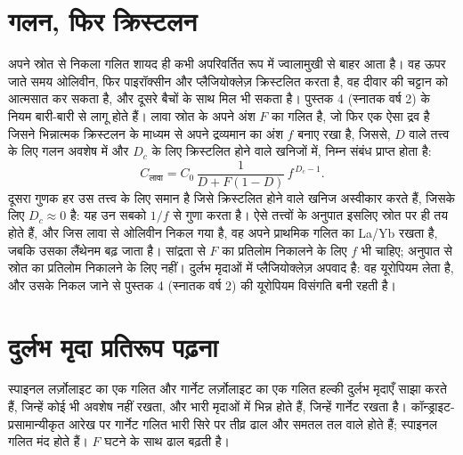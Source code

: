 \section{गलन, फिर क्रिस्टलन}\label{sec:b3:trace-element-modelling:crystallisation}

अपने स्रोत से निकला गलित शायद ही कभी अपरिवर्तित रूप में ज्वालामुखी से बाहर आता है। वह
ऊपर जाते समय ओलिवीन, फिर पाइरॉक्सीन और प्लैजियोक्लेज़ क्रिस्टलित करता है, वह दीवार की चट्टान को आत्मसात कर सकता है,
और दूसरे बैचों के साथ मिल भी सकता है। पुस्तक 4 (स्नातक वर्ष 2) के नियम बारी-बारी से लागू होते हैं।
लावा स्रोत के अपने अंश $F$ का गलित है, जो फिर एक ऐसा द्रव है
जिसने भिन्नात्मक क्रिस्टलन के माध्यम से अपने द्रव्यमान का अंश $f$ बनाए रखा है,
जिससे, $D$ वाले तत्त्व के लिए गलन अवशेष में और $D_c$ के लिए
क्रिस्टलित होने वाले खनिजों में, निम्न संबंध प्राप्त होता है:
\[
C_{\text{लावा}} = C_0\,\frac{1}{D + F(1 - D)}\,f^{\,D_c - 1}.
\]
दूसरा गुणक हर उस तत्त्व के लिए समान है जिसे क्रिस्टलित होने वाले
खनिज अस्वीकार करते हैं, जिसके लिए $D_c \approx 0$ है: यह उन सबको $1/f$ से गुणा करता है। ऐसे तत्त्वों के अनुपात
इसलिए स्रोत पर ही तय होते हैं, और जिस लावा से ओलिवीन निकल गया है, वह अपने प्राथमिक गलित का
La/Yb रखता है, जबकि उसका लैंथेनम बढ़ जाता है। सांद्रता से $F$ का प्रतिलोम निकालने
के लिए $f$ भी चाहिए; अनुपात से स्रोत का प्रतिलोम निकालने के लिए नहीं।
दुर्लभ मृदाओं में प्लैजियोक्लेज़ अपवाद है: वह यूरोपियम लेता है,
और उसके निकल जाने से पुस्तक 4 (स्नातक वर्ष 2) की यूरोपियम विसंगति बनी रहती है।

\section{दुर्लभ मृदा प्रतिरूप पढ़ना}\label{sec:b3:trace-element-modelling:patterns}

स्पाइनल लर्ज़ोलाइट का एक गलित और गार्नेट लर्ज़ोलाइट का एक गलित हल्की दुर्लभ मृदाएँ साझा करते हैं,
जिन्हें कोई भी अवशेष नहीं रखता, और भारी मृदाओं में भिन्न होते हैं,
जिन्हें गार्नेट रखता है। कॉन्ड्राइट-प्रसामान्यीकृत आरेख पर गार्नेट गलित
भारी सिरे पर तीव्र ढाल और समतल तल वाले होते हैं; स्पाइनल गलित मंद होते हैं।
$F$ घटने के साथ ढाल बढ़ती है।

